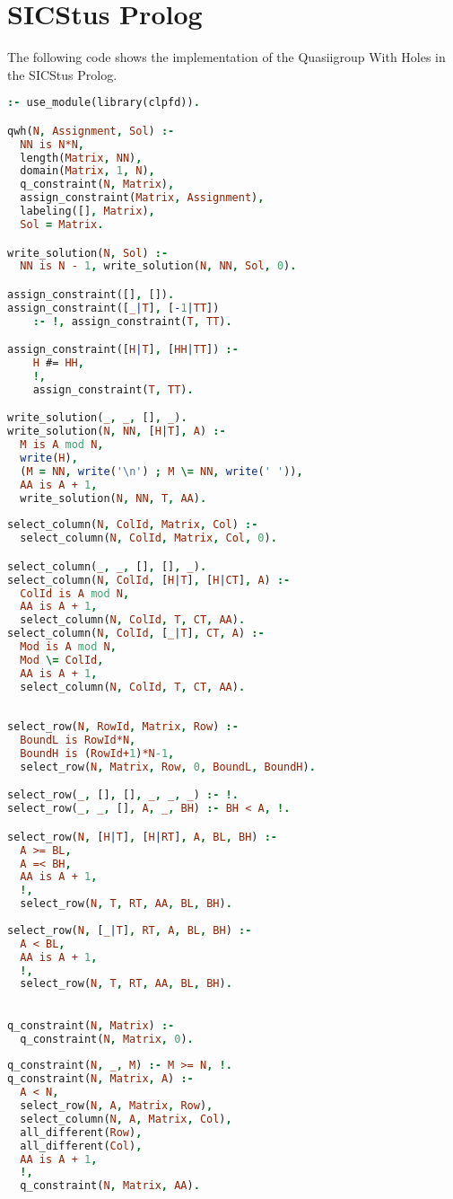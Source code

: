 \section{SICStus Prolog}
\label{implementation:sicstus}

The following code shows the implementation of the Quasiigroup With Holes in the SICStus
Prolog.

\begin{lstlisting}[language=Prolog]
:- use_module(library(clpfd)).

qwh(N, Assignment, Sol) :-
  NN is N*N,
  length(Matrix, NN),
  domain(Matrix, 1, N),
  q_constraint(N, Matrix),
  assign_constraint(Matrix, Assignment),
  labeling([], Matrix),
  Sol = Matrix.

write_solution(N, Sol) :-
  NN is N - 1, write_solution(N, NN, Sol, 0).

assign_constraint([], []).
assign_constraint([_|T], [-1|TT]) 
	:- !, assign_constraint(T, TT).

assign_constraint([H|T], [HH|TT]) :- 
	H #= HH,
	!,
	assign_constraint(T, TT).

write_solution(_, _, [], _).
write_solution(N, NN, [H|T], A) :-
  M is A mod N,
  write(H),
  (M = NN, write('\n') ; M \= NN, write(' ')),
  AA is A + 1,
  write_solution(N, NN, T, AA).
  
select_column(N, ColId, Matrix, Col) :- 
  select_column(N, ColId, Matrix, Col, 0).

select_column(_, _, [], [], _).
select_column(N, ColId, [H|T], [H|CT], A) :-
  ColId is A mod N,
  AA is A + 1,
  select_column(N, ColId, T, CT, AA).
select_column(N, ColId, [_|T], CT, A) :-
  Mod is A mod N,
  Mod \= ColId,
  AA is A + 1,
  select_column(N, ColId, T, CT, AA).
  
  
select_row(N, RowId, Matrix, Row) :-  
  BoundL is RowId*N, 
  BoundH is (RowId+1)*N-1, 
  select_row(N, Matrix, Row, 0, BoundL, BoundH).

select_row(_, [], [], _, _, _) :- !.
select_row(_, _, [], A, _, BH) :- BH < A, !.

select_row(N, [H|T], [H|RT], A, BL, BH) :-
  A >= BL,
  A =< BH,
  AA is A + 1,
  !,
  select_row(N, T, RT, AA, BL, BH).
  
select_row(N, [_|T], RT, A, BL, BH) :-
  A < BL,
  AA is A + 1,
  !,
  select_row(N, T, RT, AA, BL, BH).
  

q_constraint(N, Matrix) :-
  q_constraint(N, Matrix, 0).
  
q_constraint(N, _, M) :- M >= N, !.
q_constraint(N, Matrix, A) :- 
  A < N,
  select_row(N, A, Matrix, Row),
  select_column(N, A, Matrix, Col),
  all_different(Row),
  all_different(Col),
  AA is A + 1,
  !,
  q_constraint(N, Matrix, AA).
\end{lstlisting}